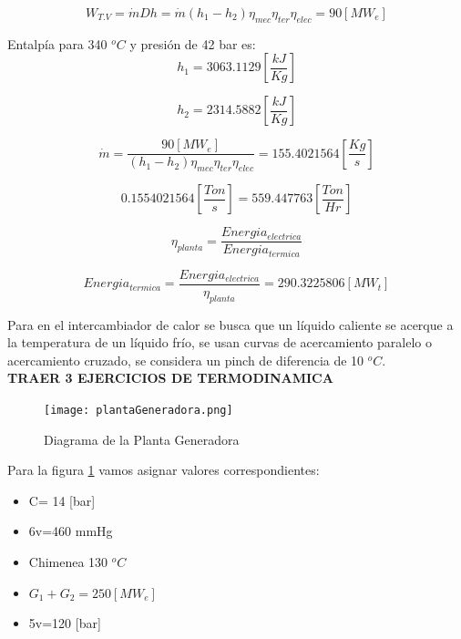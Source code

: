 \documentclass[]{article}
\begin{document}
\begin{equation}
   W_{T.V}=\dot{m}Dh=\dot{m}(h_1-h_2)\eta_{mec}\eta_{ter}\eta_{elec}=90[MW_e]
\end{equation}

Entalpía para 340 $^oC$ y presión de 42 bar es:\\

\begin{equation}
h_1=3063.1129 [\frac{kJ}{Kg}]
\end{equation}

\begin{equation}
h_2=2314.5882 [\frac{kJ}{Kg}]
\end{equation}

\begin{equation}
\dot{m}=\frac{90[MW_e]}{(h_1-h_2)\eta_{mec}\eta_{ter}\eta_{elec}}=155.4021564[\frac{Kg}{s}]
\end{equation}

\begin{equation}
0.1554021564[\frac{Ton}{s}]=559.447763[\frac{Ton}{Hr}]
\end{equation}

\begin{equation}
   \eta_{planta}=\frac{Energia_{electrica}}{Energia_{termica}}
\end{equation}

\begin{equation}
Energia_{termica}=\frac{Energia_{electrica}}{\eta_{planta}}=290.3225806[MW_t]
\end{equation}

Para en el intercambiador de calor se busca que un líquido caliente se acerque a la temperatura de un líquido frío, se usan curvas de acercamiento paralelo o acercamiento cruzado, se considera un pinch de diferencia de 10 $^oC$.\\


\textbf{TRAER 3 EJERCICIOS DE TERMODINAMICA}

\begin{figure}[h!]
	\centering
	\texttt{[image: plantaGeneradora.png]}
	\caption{Diagrama de la Planta Generadora}
	\label{fig:planta}
\end{figure}

Para la figura \ref{fig:planta} vamos asignar valores correspondientes:\\

\begin{itemize}
	\item C= 14 [bar]
	\item 6v=460 mmHg
	\item Chimenea 130 $^oC$
	\item $G_1+G_2=250 [MW_e]$
	\item 5v=120 [bar] 
\end{itemize}
\end{document}
